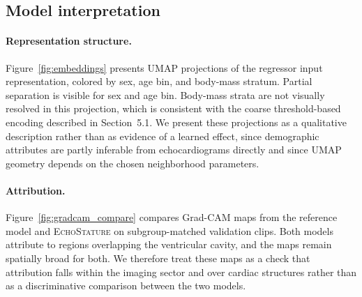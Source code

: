 \documentclass{ws-procs11x85}
\begin{document}
\subsection{Model interpretation}

\paragraph{Representation structure.}
Figure~\ref{fig:embeddings} presents UMAP projections of the regressor input representation, colored by sex, age bin, and body-mass stratum.
Partial separation is visible for sex and age bin.
Body-mass strata are not visually resolved in this projection, which is consistent with the coarse threshold-based encoding described in Section~5.1.
We present these projections as a qualitative description rather than as evidence of a learned effect, since demographic attributes are partly inferable from echocardiograms directly\cite{ghorbani2020interpretation} and since UMAP geometry depends on the chosen neighborhood parameters.

\paragraph{Attribution.}
Figure~\ref{fig:gradcam_compare} compares Grad-CAM maps from the reference model and \textsc{EchoStature} on subgroup-matched validation clips.
Both models attribute to regions overlapping the ventricular cavity, and the maps remain spatially broad for both.
We therefore treat these maps as a check that attribution falls within the imaging sector and over cardiac structures rather than as a discriminative comparison between the two models.\cite{adebayo2018sanity}
\end{document}
